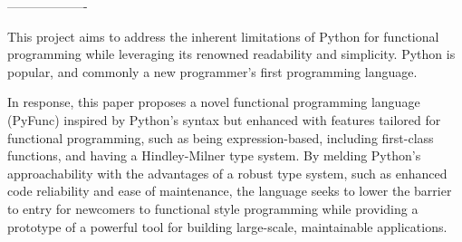 \documentclass{l4proj}
\begin{document}

\begin{center}
    -------------------
\end{center}




This project aims to address the inherent limitations of Python for functional programming while leveraging its renowned readability and simplicity.
Python is popular, and commonly a new programmer's first programming language.

In response, this paper proposes a novel functional programming language (PyFunc) inspired by Python's syntax but enhanced with features tailored for functional programming, such as being expression-based, including first-class functions, and having a Hindley-Milner type system.
By melding Python's approachability with the advantages of a robust type system, such as enhanced code reliability and ease of maintenance, the language seeks to lower the barrier to entry for newcomers to functional style programming while providing a prototype of a powerful tool for building large-scale, maintainable applications.
\end{document}
